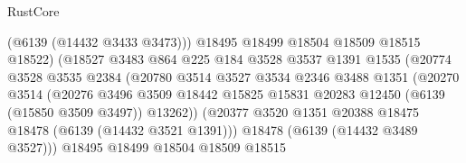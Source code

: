 \begin{lexlean}{RustCore}
\begin{coremodule}
                                        (@6139 (@14432 @3433 @3473)))
                                      @18495
                                      @18499
                                      @18504
                                      @18509
                                      @18515
                                      @18522)
                                    (@18527
                                      @3483
                                      @864
                                      @225
                                      @184
                                      @3528
                                      @3537
                                      @1391
                                      @1535
                                      (@20774
                                        @3528
                                        @3535
                                        @2384
                                        (@20780
                                          @3514
                                          @3527
                                          @3534
                                          @2346
                                          @3488
                                          @1351
                                          (@20270
                                            @3514
                                            (@20276
                                              @3496
                                              @3509
                                              @18442
                                              @15825
                                              @15831
                                              @20283
                                              @12450
                                              (@6139 (@15850 @3509 @3497))
                                              @13262))
                                          (@20377
                                            @3520
                                            @1351
                                            @20388
                                            @18475
                                            @18478
                                            (@6139 (@14432 @3521 @1391)))
                                          @18478
                                          (@6139 (@14432 @3489 @3527)))
                                        @18495
                                        @18499
                                        @18504
                                        @18509
                                        @18515

\end{coremodule}
\end{lexlean}

